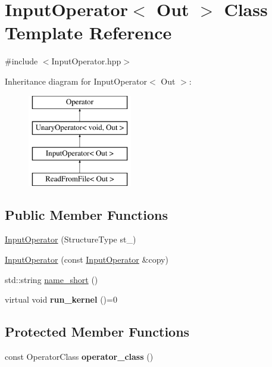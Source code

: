 \hypertarget{class_input_operator}{\section{\-Input\-Operator$<$ \-Out $>$ \-Class \-Template \-Reference}
\label{class_input_operator}
}


{\ttfamily \#include $<$\-Input\-Operator.\-hpp$>$}

\-Inheritance diagram for \-Input\-Operator$<$ \-Out $>$\-:\begin{figure}[H]
\begin{center}
\leavevmode
\includegraphics[height=4.000000cm]{class_input_operator}
\end{center}
\end{figure}
\subsection*{\-Public \-Member \-Functions}
\begin{DoxyCompactItemize}
\item 
\hyperlink{class_input_operator_a70a9e8ae6fc3e6bee0b7f1e422f7cee6}{\-Input\-Operator} (\-Structure\-Type st\-\_\-)
\item 
\hyperlink{class_input_operator_a76e4803ef97f634399cb9de1d5ec1be7}{\-Input\-Operator} (const \hyperlink{class_input_operator}{\-Input\-Operator} \&copy)
\item 
std\-::string \hyperlink{class_input_operator_a5f752278e586f9c22535bdffdbbe14d2}{name\-\_\-short} ()
\item 
\hypertarget{class_input_operator_ab0266126058393d30ffa92b7cf408d32}{virtual void {\bfseries run\-\_\-kernel} ()=0}\label{class_input_operator_ab0266126058393d30ffa92b7cf408d32}

\end{DoxyCompactItemize}
\subsection*{\-Protected \-Member \-Functions}
\begin{DoxyCompactItemize}
\item 
\hypertarget{class_input_operator_a370bbb3a5c72e0121448e8c06ae1fe28}{const \-Operator\-Class {\bfseries operator\-\_\-class} ()}\label{class_input_operator_a370bbb3a5c72e0121448e8c06ae1fe28}

\end{DoxyCompactItemize}


